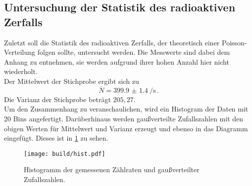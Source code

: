 \subsection{Untersuchung der Statistik des radioaktiven Zerfalls}
\label{subsec:statistik}
Zuletzt soll die Statistik des radioaktiven Zerfalls, der theoretisch einer Poisson-Verteilung folgen sollte,
untersucht werden. Die Messwerte sind dabei dem Anhang zu entnehmen, sie werden aufgrund ihrer
hohen Anzahl hier nicht wiederholt. \\
Der Mittelwert der Stichprobe ergibt sich zu
\begin{equation*}
  \overline{N} = \SI{399.9(14)}{\per\second}\,.
\end{equation*}
Die Varianz der Stichprobe beträgt $205,27$.\\

Um den Zusammenhang zu veranschaulichen, wird ein Histogram der Daten
mit 20 Bins angefertigt. Darüberhinaus werden gaußverteilte Zufallszahlen mit den obigen
Werten für Mittelwert und Varianz erzeugt und ebenso in das Diagramm eingefügt.
Dieses ist in \ref{fig:hist} zu sehen.

\begin{figure}
  \centering
  \texttt{[image: build/hist.pdf]}
  \caption{Histogramm der gemessenen Zählraten und gaußverteilter Zufallszahlen.}
  \label{fig:hist}
\end{figure}
